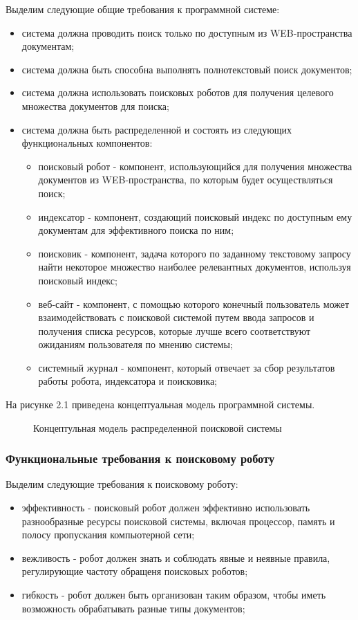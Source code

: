 Выделим следующие общие требования к программной системе:
\begin{itemize}
\item система должна проводить поиск только по доступным из WEB-пространства документам;
\item система должна быть способна выполнять полнотекстовый поиск документов;
\item система должна использовать поисковых роботов для получения целевого множества документов для поиска;
\item система должна быть распределенной и состоять из следующих функциональных компонентов:
\begin{itemize}
\item поисковый робот - компонент, использующийся для получения множества документов из WEB-пространства, по которым будет осуществляться поиск;
\item индексатор - компонент, создающий поисковый индекс по доступным ему документам для эффективного поиска по ним;
\item поисковик - компонент, задача которого по заданному текстовому запросу найти некоторое множество наиболее релевантных документов, используя поисковый индекс;
\item веб-сайт - компонент, с помощью которого конечный пользователь может взаимодействовать с поисковой системой путем ввода запросов и получения списка ресурсов, которые лучше всего соответствуют ожиданиям пользователя по мнению системы;
\item системный журнал - компонент, который отвечает за сбор результатов работы робота, индексатора и поисковика;
\end{itemize}
\end{itemize}

На рисунке 2.1 приведена концептуальная модель программной системы.

\begin{figure}[H]
\caption{Концептульная модель распределенной поисковой системы}
\label{concept_system_model:image}
\end{figure}

\subsubsection{Функциональные требования к поисковому роботу}
Выделим следующие требования к поисковому роботу:
\begin{itemize}
\item эффективность - поисковый робот должен эффективно использовать разнообразные ресурсы поисковой системы, включая процессор, память и полосу пропускания компьютерной сети;
\item вежливость - робот должен знать и соблюдать явные и неявные правила, регулирующие частоту обращеня поисковых роботов;
\item гибкость - робот должен быть организован таким образом, чтобы иметь возможность обрабатывать разные типы документов;
\end{itemize}

